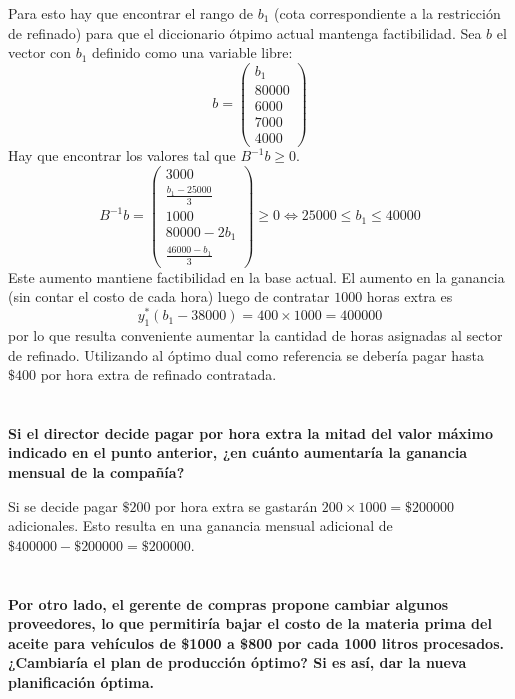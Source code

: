 \documentclass[10pt,a4paper]{article}
\begin{document}
	\vspace{5mm}
	
	Para esto hay que encontrar el rango de $b_1$ (cota correspondiente a la restricción de refinado) para que el diccionario ótpimo actual mantenga factibilidad. Sea $b$ el vector con $b_1$ definido como una variable libre:
	$$
	b = \begin{pmatrix}
		b_1 \\
		80000 \\
		6000 \\
		7000 \\
		4000
	\end{pmatrix}
	$$
	Hay que encontrar los valores tal que $B^{-1}b \geq 0$.
	$$
	B^{-1}b =
	\begin{pmatrix}
		3000 \\
		\frac{b_1 - 25000}{3} \\
		1000 \\
		80000 - 2b_1 \\
		\frac{46000 - b_1}{3}
	\end{pmatrix} \geq 0 \iff 25000 \leq b_1 \leq 40000
	$$
	Este aumento mantiene factibilidad en la base actual. El aumento en la ganancia (sin contar el costo de cada hora) luego de contratar $1000$ horas extra es $$y^*_1(b_1 - 38000) = 400 \times 1000 = 400000$$
	por lo que resulta conveniente aumentar la cantidad de horas asignadas al sector de refinado. Utilizando al óptimo dual como referencia se debería pagar hasta $\$400$ por hora extra de refinado contratada.
	\section{} %
	\textbf{Si el director decide pagar por hora extra la mitad del valor máximo indicado en el punto anterior, ¿en cuánto aumentaría la ganancia mensual de la compañía?}
	
	\vspace{5mm}
	
	Si se decide pagar $\$200$ por hora extra se gastarán $200 \times 1000 = \$200000$ adicionales. Esto resulta en una ganancia mensual adicional de $\$400000 - \$200000 = \$200000$.
	
	\section{} %
	\textbf{Por otro lado, el gerente de compras propone cambiar algunos proveedores, lo que permitiría bajar el costo de la materia prima del aceite para vehículos de \$1000 a \$800 por cada 1000 litros procesados. ¿Cambiaría el plan de producción óptimo? Si es así, dar la nueva planificación óptima.}
	
\end{document}
